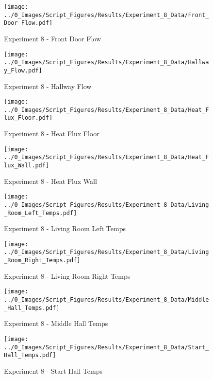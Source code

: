 	\clearpage

	\begin{figure}[H]
		\centering
		\texttt{[image: ../0\_Images/Script\_Figures/Results/Experiment\_8\_Data/Front\_Door\_Flow.pdf]}
		\caption[]{Experiment 8 - Front Door Flow}
	\end{figure}
 

	\begin{figure}[H]
		\centering
		\texttt{[image: ../0\_Images/Script\_Figures/Results/Experiment\_8\_Data/Hallway\_Flow.pdf]}
		\caption[]{Experiment 8 - Hallway Flow}
	\end{figure}
 
	\clearpage

	\begin{figure}[H]
		\centering
		\texttt{[image: ../0\_Images/Script\_Figures/Results/Experiment\_8\_Data/Heat\_Flux\_Floor.pdf]}
		\caption[]{Experiment 8 - Heat Flux Floor}
	\end{figure}
 

	\begin{figure}[H]
		\centering
		\texttt{[image: ../0\_Images/Script\_Figures/Results/Experiment\_8\_Data/Heat\_Flux\_Wall.pdf]}
		\caption[]{Experiment 8 - Heat Flux Wall}
	\end{figure}
 
	\clearpage

	\begin{figure}[H]
		\centering
		\texttt{[image: ../0\_Images/Script\_Figures/Results/Experiment\_8\_Data/Living\_Room\_Left\_Temps.pdf]}
		\caption[]{Experiment 8 - Living Room Left Temps}
	\end{figure}
 

	\begin{figure}[H]
		\centering
		\texttt{[image: ../0\_Images/Script\_Figures/Results/Experiment\_8\_Data/Living\_Room\_Right\_Temps.pdf]}
		\caption[]{Experiment 8 - Living Room Right Temps}
	\end{figure}
 
	\clearpage

	\begin{figure}[H]
		\centering
		\texttt{[image: ../0\_Images/Script\_Figures/Results/Experiment\_8\_Data/Middle\_Hall\_Temps.pdf]}
		\caption[]{Experiment 8 - Middle Hall Temps}
	\end{figure}
 

	\begin{figure}[H]
		\centering
		\texttt{[image: ../0\_Images/Script\_Figures/Results/Experiment\_8\_Data/Start\_Hall\_Temps.pdf]}
		\caption[]{Experiment 8 - Start Hall Temps}
	\end{figure}
 
